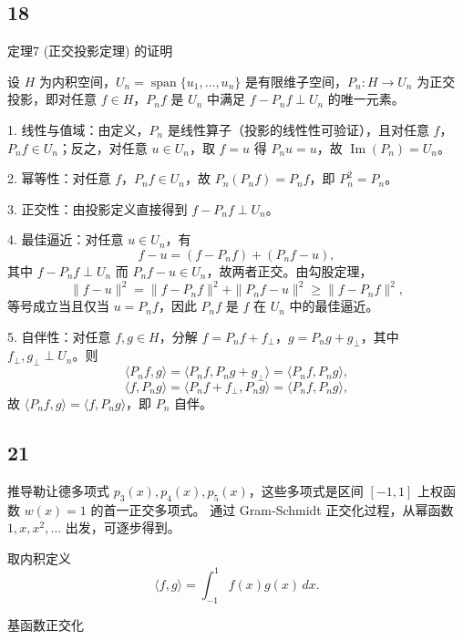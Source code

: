 \documentclass{article}
\begin{document}
\subsection*{18}

定理7 (正交投影定理) 的证明

设 \(H\) 为内积空间，\(U_n = \operatorname{span}\{u_1,\dots,u_n\}\) 是有限维子空间，\(P_n: H \to U_n\) 为正交投影，即对任意 \(f\in H\)，\(P_n f\) 是 \(U_n\) 中满足 \(f - P_n f \perp U_n\) 的唯一元素。

1. 线性与值域：由定义，\(P_n\) 是线性算子（投影的线性性可验证），且对任意 \(f\)，\(P_n f \in U_n\)；反之，对任意 \(u\in U_n\)，取 \(f=u\) 得 \(P_n u = u\)，故 \(\operatorname{Im}(P_n)=U_n\)。

2. 幂等性：对任意 \(f\)，\(P_n f \in U_n\)，故 \(P_n(P_n f)=P_n f\)，即 \(P_n^2 = P_n\)。

3. 正交性：由投影定义直接得到 \(f - P_n f \perp U_n\)。

4. 最佳逼近：对任意 \(u\in U_n\)，有  
   \[
   f - u = (f - P_n f) + (P_n f - u),
   \]  
   其中 \(f-P_n f \perp U_n\) 而 \(P_n f - u \in U_n\)，故两者正交。由勾股定理，
   \[
   \|f-u\|^2 = \|f-P_n f\|^2 + \|P_n f - u\|^2 \ge \|f-P_n f\|^2,
   \]  
   等号成立当且仅当 \(u = P_n f\)，因此 \(P_n f\) 是 \(f\) 在 \(U_n\) 中的最佳逼近。

5. 自伴性：对任意 \(f,g\in H\)，分解 \(f = P_n f + f_\perp\)，\(g = P_n g + g_\perp\)，其中 \(f_\perp,g_\perp \perp U_n\)。则  
   \[
   \langle P_n f, g \rangle = \langle P_n f, P_n g + g_\perp \rangle = \langle P_n f, P_n g \rangle,
   \]  
   \[
   \langle f, P_n g \rangle = \langle P_n f + f_\perp, P_n g \rangle = \langle P_n f, P_n g \rangle,
   \]  
   故 \(\langle P_n f, g \rangle = \langle f, P_n g \rangle\)，即 \(P_n\) 自伴。

\subsection*{21}

推导勒让德多项式 \(p_3(x), p_4(x), p_5(x)\)，这些多项式是区间 \([-1, 1]\) 上权函数 \(w(x)=1\) 的首一正交多项式。
通过 Gram-Schmidt 正交化过程，从幂函数 \(1, x, x^2, \ldots\) 出发，可逐步得到。

取内积定义
\[
\langle f, g \rangle = \int_{-1}^1 f(x) g(x) \, dx.
\]

基函数正交化
\end{document}
